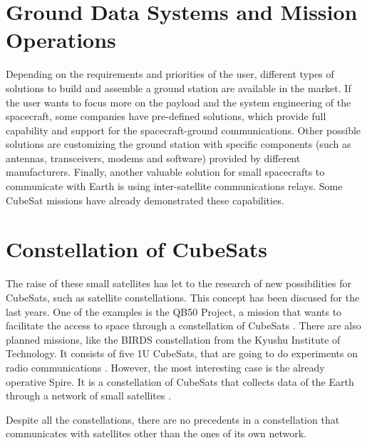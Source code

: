 \section*{Ground Data Systems and Mission Operations}
Depending on the requirements and priorities of the user, different types of solutions to build and assemble a ground station are available in the market. If the user wants to focus more on the payload and the system engineering of the spacecraft, some companies have pre-defined solutions, which provide full capability and support for the spacecraft-ground communications. Other possible solutions are customizing the ground station with specific components (such as antennas, transceivers, modems and software) provided by different manufacturers. Finally, another valuable solution for small spacecrafts to communicate with Earth is using inter-satellite communications relays. Some CubeSat missions have already demonstrated these capabilities. 

\section*{Constellation of CubeSats}
The raise of these small satellites has let to the research of new possibilities for CubeSats, such as satellite constellations. This concept has been discused for the last years. One of the examples is the QB50 Project, a mission that wants to facilitate the access to space through a constellation of CubeSats \cite{qb50}. There are also planned missions, like the BIRDS constellation from the Kyushu Institute of Technology. It consists of five 1U CubeSats, that are going to do experiments on radio communications \cite{KyushuInstituteofTechnology2017}. However, the most interesting case is the already operative Spire. It is a constellation of CubeSats that collects data of the Earth through a network of small satellites \cite{spire}.

Despite all the constellations, there are no precedents in a constellation that communicates with satellites other than the ones of its own network.